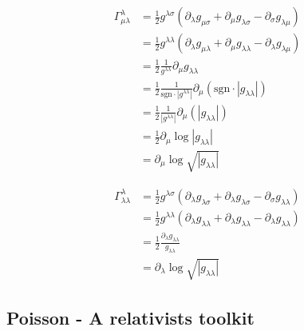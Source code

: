 \documentclass[10pt,a4paper]{article}
\theoremstyle{definition}
\begin{document}
\begin{align}
\Gamma^\lambda_{\mu\lambda}
&=\frac{1}{2}g^{\lambda\sigma}(\partial_\lambda g_{\mu\sigma}+\partial_\mu g_{\lambda\sigma}-\partial_\sigma g_{\lambda\mu})\\
&=\frac{1}{2}g^{\lambda\lambda}(\partial_\lambda g_{\mu\lambda}+\partial_\mu g_{\lambda\lambda}-\partial_\lambda g_{\lambda\mu})\\
&=\frac{1}{2}\frac{1}{g^{\lambda\lambda}}\partial_\mu g_{\lambda\lambda}\\
&=\frac{1}{2}\frac{1}{\text{sgn}\cdot|g^{\lambda\lambda}|}\partial_\mu (\text{sgn}\cdot|g_{\lambda\lambda}|)\\
&=\frac{1}{2}\frac{1}{|g^{\lambda\lambda}|}\partial_\mu (|g_{\lambda\lambda}|)\\
&=\frac{1}{2}\partial_\mu \log|g_{\lambda\lambda}|\\
&=\partial_\mu \log\sqrt{|g_{\lambda\lambda}|}
\end{align}

\begin{align}
\Gamma^\lambda_{\lambda\lambda}
&=\frac{1}{2}g^{\lambda\sigma}(\partial_\lambda g_{\lambda\sigma}+\partial_\lambda g_{\lambda\sigma}-\partial_\sigma g_{\lambda\lambda})\\
&=\frac{1}{2}g^{\lambda\lambda}(\partial_\lambda g_{\lambda\lambda}+\partial_\lambda g_{\lambda\lambda}-\partial_\lambda g_{\lambda\lambda})\\
&=\frac{1}{2}\frac{\partial_\lambda g_{\lambda\lambda}}{g_{\lambda\lambda}}\\
&=\partial_\lambda \log \sqrt{|g_{\lambda\lambda}|}
\end{align}

\subsection{{\sc Poisson} - A relativists toolkit}
\end{document}
